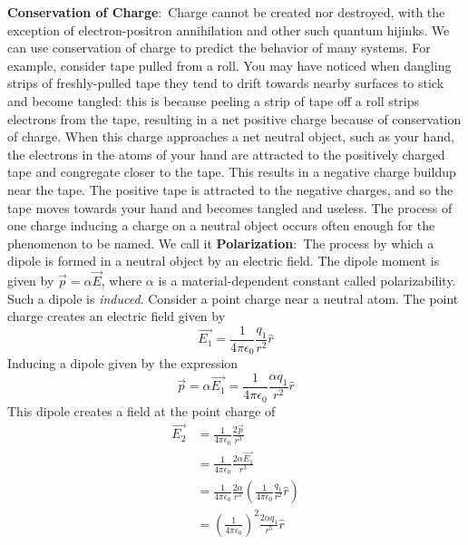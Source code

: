 \documentclass[nobib]{tufte-handout}
\newcommand{\defn}[2]{\noindent\textbf{#1}:\ #2}
\begin{document}
\defn{Conservation of Charge}{Charge cannot be created nor 
destroyed, with the exception of electron-positron annihilation
and other such quantum hijinks.} We can use conservation
of charge to predict the behavior 
of many systems. For example, consider tape pulled from a roll.
You may have noticed when dangling strips of freshly-pulled tape 
they tend to drift towards nearby surfaces to stick and become tangled:
this is because peeling a strip of tape off a roll strips electrons 
from the tape, resulting in a net positive charge because of 
conservation of charge. When this charge approaches a net neutral 
object, such as your hand, the electrons in the atoms of your hand
are attracted to the positively charged tape and congregate closer to the tape.
This results in a negative charge buildup near the tape. The
positive tape is attracted to the negative charges, and so the tape
moves towards your hand and becomes tangled and useless. The process
of one charge inducing a charge on a neutral object occurs 
often enough for the phenomenon to be named. We call it
\defn{Polarization}{The process by which a dipole is formed
in a neutral object by an electric field.} The dipole moment is given by
$\vec{p} = \alpha \vec{E}$, where $\alpha$ is a material-dependent constant
called polarizability. Such a dipole is \emph{induced}. Consider 
a point charge near a neutral atom. The point charge creates an 
electric field given by 
\[\vec{E_1} = \frac{1}{4\pi \epsilon_0}\frac{q_1}{r^2}\hat{r}\]
Inducing a dipole given by the expression
\[\vec{p} = \alpha \vec{E_1} = \frac{1}{4\pi \epsilon_0}\frac{\alpha q_1}{r^2}\hat{r}\]
This dipole creates a field at the point charge of
\begin{align*}
    \vec{E_2} &= \frac{1}{4\pi \epsilon_0}\frac{2\vec{p}}{r^3} \\
    &= \frac{1}{4\pi \epsilon_0}\frac{2\alpha \vec{E_1}}{r^3} \\
    &= \frac{1}{4\pi \epsilon_0}\frac{2\alpha}{r^3}(\frac{1}{4\pi \epsilon_0} \frac{q_1}{r^2}\hat{r}) \\
    &= \left(\frac{1}{4\pi \epsilon_0}\right)^2 \frac{2 \alpha q_1}{r^5}\hat{r}
\end{align*}
\end{document}
